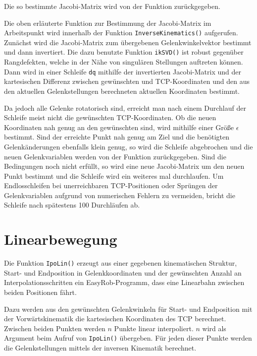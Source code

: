 \documentclass[11pt, a4paper]{article}
\newcommand{\code}{\texttt}
\begin{document}
Die so bestimmte Jacobi-Matrix wird von der Funktion zurückgegeben.



Die oben erläuterte Funktion zur Bestimmung der Jacobi-Matrix im Arbeitspunkt wird innerhalb der Funktion \code{InverseKinematics()} aufgerufen. Zunächst wird die Jacobi-Matrix zum übergebenen Gelenkwinkelvektor bestimmt und dann invertiert. Die dazu benutzte Funktion \code{ikSVD()} ist robust gegenüber Rangdefekten, welche in der Nähe von singulären Stellungen auftreten können. Dann wird in einer Schleife \code{dq} mithilfe der invertierten Jacobi-Matrix und der kartesischen Differenz zwischen gewünschten und TCP-Koordinaten und den aus den aktuellen Gelenkstellungen berechneten aktuellen Koordinaten bestimmt.

Da jedoch alle Gelenke rotatorisch sind, erreicht man nach einem Durchlauf der Schleife meist nicht die gewünschten TCP-Koordinaten. Ob die neuen Koordinaten nah genug an den gewünschten sind, wird mithilfe einer Größe $\epsilon$ bestimmt. Sind der erreichte Punkt nah genug am Ziel und die benötigten Gelenkänderungen ebenfalls klein genug, so wird die Schleife abgebrochen und die neuen Gelenkvariablen werden von der Funktion zurückgegeben. Sind die Bedingungen noch nicht erfüllt, so wird eine neue Jacobi-Matrix um den neuen Punkt bestimmt und die Schleife wird ein weiteres mal durchlaufen. Um Endlosschleifen bei unerreichbaren TCP-Positionen oder Sprüngen der Gelenkvariablen aufgrund von numerischen Fehlern zu vermeiden, bricht die Schleife nach spätestens 100 Durchläufen ab.



\section{Linearbewegung}
Die Funktion \code{IpoLin()} erzeugt aus einer gegebenen  kinematischen Struktur, Start- und Endposition in Gelenkkoordinaten und der gewünschten Anzahl an Interpolationsschritten ein EasyRob-Programm, dass eine Linearbahn zwischen beiden Positionen fährt.

Dazu werden aus den gewünschten Gelenkwinkeln für Start- und Endposition mit der Vorwärtskinematik die kartesischen Koordinaten des TCP berechnet. Zwischen beiden Punkten werden $n$ Punkte linear interpoliert. $n$ wird als Argument beim Aufruf von \code{IpoLin()} übergeben. Für jeden dieser Punkte werden die Gelenkstellungen mittels der inversen Kinematik berechnet.
\end{document}
